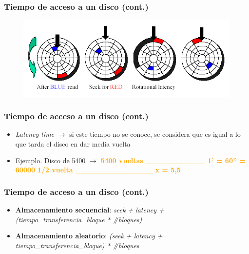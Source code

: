 \begin{frame}
  \frametitle{Tiempo de acceso a un disco (cont.)}
  \begin{figure}
      \includegraphics[scale=0.5]{images/dat2.png}
  \end{figure}
\end{frame}

\begin{frame}
  \frametitle{Tiempo de acceso a un disco (cont.)}
  \begin{itemize}
    \item \emph{Latency time} $\rightarrow$ si este tiempo no se conoce, se considera que es igual a lo que tarda el disco en dar media vuelta
    \item Ejemplo. Disco de 5400 \rpm $\rightarrow$
      \linebreak
      \linebreak
      \hspace{35pt} \textcolor{orange}{\textbf{5400 vueltas \_\_\_\_\_\_\_\_\_\_ 1' = 60'' = 60000 \ms}}
      \linebreak  
      \hspace{35pt} \textcolor{orange}{\textbf{1/2 vuelta \_\_\_\_\_\_\_\_\_\_\_\_\_ x = 5,5 \ms}}
  \end{itemize}
\end{frame}

\begin{frame}
  \frametitle{Tiempo de acceso a un disco (cont.)}
  \begin{itemize}
    \item \textbf{Almacenamiento secuencial}:
      \linebreak
      \hspace{35pt} \emph{seek + latency + (tiempo\_transferencia\_bloque * \#bloques)}
    \item \textbf{Almacenamiento aleatorio}:
      \linebreak
      \hspace{35pt} \emph{(seek + latency + tiempo\_transferencia\_bloque) * \#bloques}      
  \end{itemize}
\end{frame}

